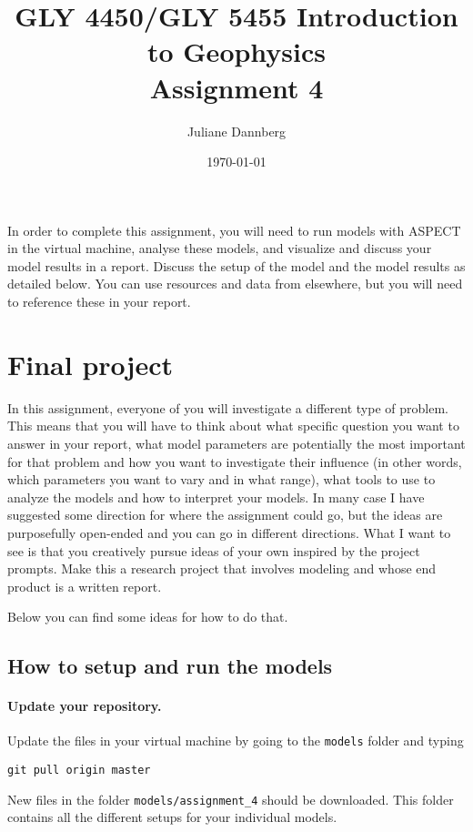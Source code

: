 \documentclass[notitlepage]{article}
\title{GLY 4450/GLY 5455 Introduction to Geophysics\\Assignment 4}
\author{Juliane Dannberg}
\date{\today}
\begin{document}
\maketitle

In order to complete this assignment, you will need to run models with ASPECT in the virtual machine, analyse these models, and visualize and discuss your model results in a report. Discuss the setup of the model and the model results as detailed below. You can use resources and data from elsewhere, but you will need to reference these in your report.



\section{Final project}

In this assignment, everyone of you will investigate a different type of problem. 
This means that you will have to think about what specific question you want to answer in your report, 
what model parameters are potentially the most important for that problem 
and how you want to investigate their influence (in other words, which parameters you want to vary and in what range),
what tools to use to analyze the models and how to interpret your models. 
In many case I have suggested some direction for where the assignment could go, 
but the ideas are purposefully open-ended and you can go in different directions. 
What I want to see is that you creatively pursue ideas of your own inspired by the project prompts. 
Make this a research project that involves modeling and whose end product is a written report.

Below you can find some ideas for how to do that. 

\subsection{How to setup and run the models}


\paragraph{Update your repository.}
Update the files in your virtual machine by going to the \texttt{models} folder and typing 

\begin{verbatim}
git pull origin master
\end{verbatim}

New files in the folder \texttt{models/assignment\_4} should be downloaded. This folder contains all the different setups
for your individual models. 
\end{document}
